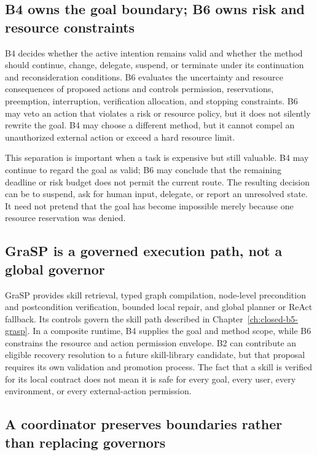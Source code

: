 \subsection{B4 owns the goal boundary; B6 owns risk and resource constraints}
\label{subsec:ch18-b4-b6-boundary}

B4 decides whether the active intention remains valid and whether the method should continue, change, delegate, suspend, or terminate under its continuation and reconsideration conditions. B6 evaluates the uncertainty and resource consequences of proposed actions and controls permission, reservations, preemption, interruption, verification allocation, and stopping constraints. B6 may veto an action that violates a risk or resource policy, but it does not silently rewrite the goal. B4 may choose a different method, but it cannot compel an unauthorized external action or exceed a hard resource limit.

This separation is important when a task is expensive but still valuable. B4 may continue to regard the goal as valid; B6 may conclude that the remaining deadline or risk budget does not permit the current route. The resulting decision can be to suspend, ask for human input, delegate, or report an unresolved state. It need not pretend that the goal has become impossible merely because one resource reservation was denied.

\subsection{GraSP is a governed execution path, not a global governor}
\label{subsec:ch18-grasp-boundary}

GraSP provides skill retrieval, typed graph compilation, node-level precondition and postcondition verification, bounded local repair, and global planner or ReAct fallback. Its controls govern the skill path described in Chapter~\ref{ch:closed-b5-grasp}. In a composite runtime, B4 supplies the goal and method scope, while B6 constrains the resource and action permission envelope. B2 can contribute an eligible recovery resolution to a future skill-library candidate, but that proposal requires its own validation and promotion process. The fact that a skill is verified for its local contract does not mean it is safe for every goal, every user, every environment, or every external-action permission.

\subsection{A coordinator preserves boundaries rather than replacing governors}
\label{subsec:ch18-coordinator}

